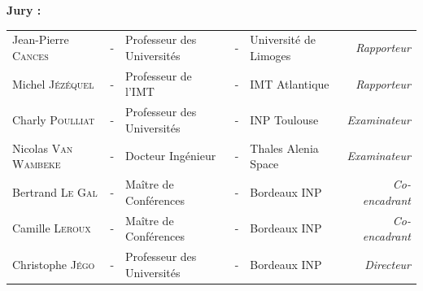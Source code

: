 \documentclass[a4paper, 11pt]{article}
\begin{document}
          \noindent \large \textbf{Jury :} \\
          \vspace*{-1.5em}
          \begin{center}
            \begin{tabular}{lclclr}
              Jean-Pierre \textsc{Cances}  &-& Professeur des Universités & - & Université de Limoges                & \textit{Rapporteur}   \\
              Michel \textsc{Jézéquel}     & - & Professeur de l'IMT & - & IMT Atlantique                & \textit{Rapporteur}   \\
              Charly \textsc{Poulliat}          & - & Professeur des Universités                      & - & INP Toulouse        & \textit{Examinateur}   \\
              Nicolas \textsc{Van Wambeke} & - & Docteur Ingénieur                  & - & Thales Alenia Space & \textit{Examinateur}  \\
              Bertrand \textsc{Le Gal}     & - & Maître de Conférences      & - & Bordeaux INP        & \textit{Co-encadrant} \\
              Camille \textsc{Leroux}      & - & Maître de Conférences      & - & Bordeaux INP        & \textit{Co-encadrant} \\
              Christophe \textsc{Jégo}     & - & Professeur des Universités & - & Bordeaux INP        & \textit{Directeur}    \\
            \end{tabular}
          \end{center}
          
          
          
        
\end{document}
